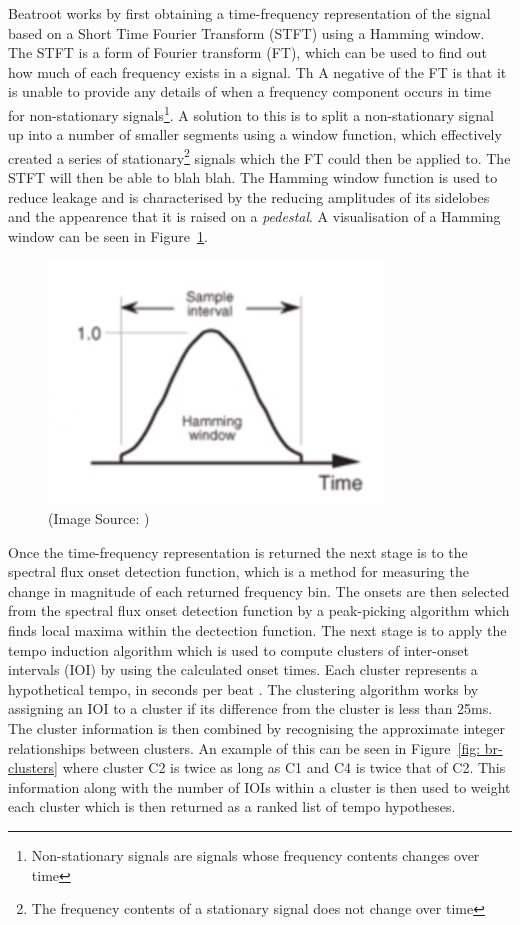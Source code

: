 \documentclass[a4paper, 11pt]{article}
\begin{document}
Beatroot works by first obtaining a time-frequency representation of the signal based on a Short Time Fourier Transform (STFT) using a Hamming window\cite{dixon2}. The STFT is a form of Fourier transform (FT), which can be used to find out how much of each frequency exists in a signal. Th A negative of the FT is that it is unable to provide any details of when a frequency component occurs in time for non-stationary signals\footnote{Non-stationary signals are signals whose frequency contents changes over time\cite{polikapt2}}. A solution to this is to split a non-stationary signal up into a number of smaller segments using a window function, which effectively created a series of stationary\footnote{The frequency contents of a stationary signal does not change over time} signals which the FT could then be applied to. The STFT will then be able to blah blah. The Hamming window function is used to reduce leakage and is characterised by the reducing amplitudes of its sidelobes and the appearence that it is raised on a \textit{pedestal}\cite{lyons}. A visualisation of a Hamming window can be seen in Figure~\ref{fig: hamWin}. 

\begin{figure}[h]
	\centering
	\includegraphics[scale=0.36]{hamWin}
	\caption{(Image Source: \cite{lyons})}
	\label{fig: hamWin}
\end{figure}

Once the time-frequency representation is returned the next stage is to the spectral flux onset detection function, which is a method for measuring the change in magnitude of each returned frequency bin\cite{dixon2}. The onsets are then selected from the spectral flux onset detection function by a peak-picking algorithm which finds local maxima within the dectection function. The next stage is to apply the tempo induction algorithm which is used to compute clusters of inter-onset intervals (IOI) by using the calculated onset times. Each cluster represents a hypothetical tempo, in seconds per beat \cite{dixon1}. The clustering algorithm works by assigning an IOI to a cluster if its difference from the cluster is less than 25ms. The cluster information is then combined by recognising the approximate integer relationships between clusters. An example of this can be seen in Figure~\ref{fig: br-clusters} where cluster C2 is twice as long as C1 and C4 is twice that of C2. This information along with the number of IOIs within a cluster is then used to weight each cluster which is then returned as a ranked list of tempo hypotheses\cite{dixon4}.
\end{document}
